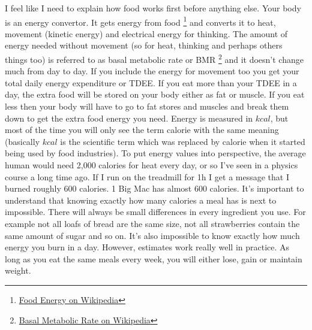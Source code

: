 \documentclass[openany, 12pt]{book}
\begin{document}
	I feel like I need to explain how food works first before anything else. Your body is an energy convertor. It gets energy from food
        \footnote{\href{https://en.wikipedia.org/wiki/Food_energy}{Food Energy on Wikipedia}} and converts it to heat, movement (kinetic energy) and 
	electrical energy for thinking. The amount of energy needed without movement (so for heat, thinking and perhaps others things too) is referred 
	to as basal metabolic rate or BMR
        \footnote{\href{https://en.wikipedia.org/wiki/Basal_metabolic_rate}{Basal Metabolic Rate on Wikipedia}} and it
	doesn't change much from day to day. If you include the energy for movement too you get your total daily energy expenditure or TDEE. If you eat
	more than your TDEE in a day, the extra food will be stored on your body either as fat or muscle. If you eat less then your body will have to go
	to fat stores and muscles and break them down to get the extra food energy you need. Energy is measured in $kcal$, but most of the time you will
	only see the term calorie with the same meaning (basically $kcal$ is the scientific term which was replaced by calorie when it started being used
	by food industries). To put energy values into perspective, the average human would need 2,000 calories for heat every day, or so I've seen in a
	physics course a long time ago. If I run on the treadmill for 1h I get a message that I burned roughly 600 calories. 1 Big Mac has almost 600 calories.
        It's important to understand that knowing exactly how many calories a meal has is next to impossible. There will always be small differences in every
        ingredient you use. For example not all loafs of bread are the same size, not all strawberries contain the same amount of sugar and so on. It's also
        impossible to know exactly how much energy you burn in a day. However, estimates work really well in practice. As long as you eat the same meals every week,
        you will either lose, gain or maintain weight.
	
\end{document}
